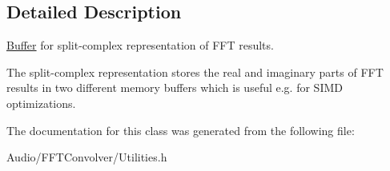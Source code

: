 \subsection{Detailed Description}
\hyperlink{class_buffer}{Buffer} for split-\/complex representation of F\+FT results. 

The split-\/complex representation stores the real and imaginary parts of F\+FT results in two different memory buffers which is useful e.\+g. for S\+I\+MD optimizations. 

The documentation for this class was generated from the following file\+:\begin{DoxyCompactItemize}
\item 
Audio/\+F\+F\+T\+Convolver/Utilities.\+h\end{DoxyCompactItemize}
